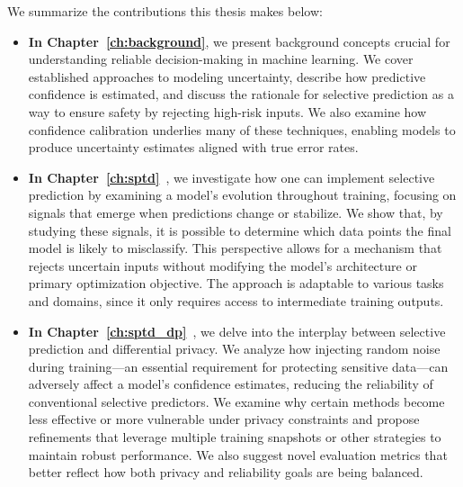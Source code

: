 We summarize the contributions this thesis makes below:
\begin{itemize}
    \item \textbf{In Chapter~\ref{ch:background}}, we present background concepts crucial for understanding reliable decision-making in machine learning. We cover established approaches to modeling uncertainty, describe how predictive confidence is estimated, and discuss the rationale for selective prediction as a way to ensure safety by rejecting high-risk inputs. We also examine how confidence calibration underlies many of these techniques, enabling models to produce uncertainty estimates aligned with true error rates.

    \item \textbf{In Chapter~\ref{ch:sptd}}~\citep{rabanser2022selective}, we investigate how one can implement selective prediction by examining a model’s evolution throughout training, focusing on signals that emerge when predictions change or stabilize. We show that, by studying these signals, it is possible to determine which data points the final model is likely to misclassify. This perspective allows for a mechanism that rejects uncertain inputs without modifying the model’s architecture or primary optimization objective. The approach is adaptable to various tasks and domains, since it only requires access to intermediate training outputs.

    \item \textbf{In Chapter~\ref{ch:sptd_dp}}~\citep{rabanser2023training}, we delve into the interplay between selective prediction and differential privacy. We analyze how injecting random noise during training—an essential requirement for protecting sensitive data—can adversely affect a model's confidence estimates, reducing the reliability of conventional selective predictors. We examine why certain methods become less effective or more vulnerable under privacy constraints and propose refinements that leverage multiple training snapshots or other strategies to maintain robust performance. We also suggest novel evaluation metrics that better reflect how both privacy and reliability goals are being balanced.



\end{itemize}
